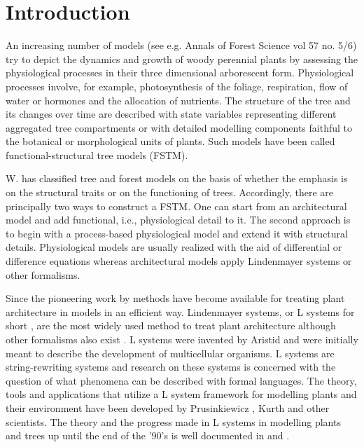 \section{Introduction} 

An increasing number of models  (see e.g. Annals of Forest Science vol
57 no.  5/6) try to depict  the dynamics and growth of woody perennial
plants  by  assessing  the  physiological  processes  in  their  three
dimensional  arborescent form.   Physiological processes  involve, for
example, photosynthesis of the  foliage, respiration, flow of water or
hormones and the  allocation of nutrients.  The structure  of the tree
and  its  changes  over   time  are  described  with  state  variables
representing different  aggregated tree compartments  or with detailed
modelling components faithful to  the botanical or morphological units
of plants.   Such models  have been called  functional-structural tree
models (FSTM).

W.  \citet{kurth:94b}  has  classified tree and  forest  models on the
basis of whether  the emphasis is on  the structural traits or  on the
functioning of trees.  Accordingly, there  are principally two ways to
construct  a  FSTM.     One can start   from   an  architectural model
\citep{jaeger:92,  kurth:94} and  add  functional, i.e., physiological
detail to it.  The second  approach is to  begin with a  process-based
physiological model \citep{makela:86, landsberg:86, makela:97-1}   and
extend it with   structural details. Physiological models  are usually
realized with  the  aid of    differential  or difference    equations
\citep{landsberg:86} whereas  architectural  models  apply Lindenmayer
systems \citep{kurth:99,pp:90} or other formalisms.

Since  the pioneering  work  by \citet{honda:71}  methods have  become
available for  treating plant architecture  in models in  an efficient
way.  Lindenmayer  systems, or L systems for  short \citep{pp:89}, are
the most widely used method to treat plant architecture although other
formalisms   also  exist  \citep[e.g.][]{dereffye:97,   godin:99}.   L
systems    were    invented    by    Aristid    \citet{lindenmayer:68,
  lindenmayer:71} and were initially meant to describe the development
of  multicellular organisms.  L  systems are  string-rewriting systems
and research on  these systems is concerned with  the question of what
phenomena can  be described with formal languages.   The theory, tools
and  applications that  utilize  a L  system  framework for  modelling
plants  and their  environment  have been  developed by  Prusinkiewicz
\citep{pp:89,pp:92}, Kurth \citep{kurth:94} and other scientists.  The
theory and  the progress  made in  L systems  in modelling
plants and trees  up until the end of the '90's  is well documented in
\citet{pp:90,pp:99} and \citet{kurth:99}.


